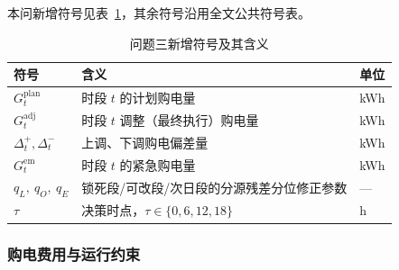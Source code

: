 本问新增符号见表~\ref{tab:q3_symbols}，其余符号沿用全文公共符号表。

\begin{table}[!htbp]
  \centering
  \caption{问题三新增符号及其含义}
  \label{tab:q3_symbols}
  \small


  \begin{tabularx}{0.76\textwidth}{
    >{\raggedright\arraybackslash}p{}
    >{\raggedright\arraybackslash}X
    >{\raggedright\arraybackslash}p{}
  }
    \toprule

    \rowcolor{headerblue}
    符号 & 含义 & 单位 \\

    \midrule

    $G^{\mathrm{plan}}_t$
    & 时段 $t$ 的计划购电量
    & kWh \\

    \rowcolor{rowblue}
    $G^{\mathrm{adj}}_t$
    & 时段 $t$ 调整（最终执行）购电量
    & kWh \\

    $\Delta^{+}_t,\Delta^{-}_t$
    & 上调、下调购电偏差量
    & kWh \\

    \rowcolor{rowblue}
    $G^{\mathrm{em}}_t$
    & 时段 $t$ 的紧急购电量
    & kWh \\

    $q_L,\ q_O,\ q_E$
    & 锁死段/可改段/次日段的分源残差分位修正参数
    & --- \\

    \rowcolor{rowblue}
    $\tau$
    & 决策时点，$\tau\in\{0,6,12,18\}$
    & h \\

    \bottomrule
  \end{tabularx}
\end{table}

\subsubsection{购电费用与运行约束}

